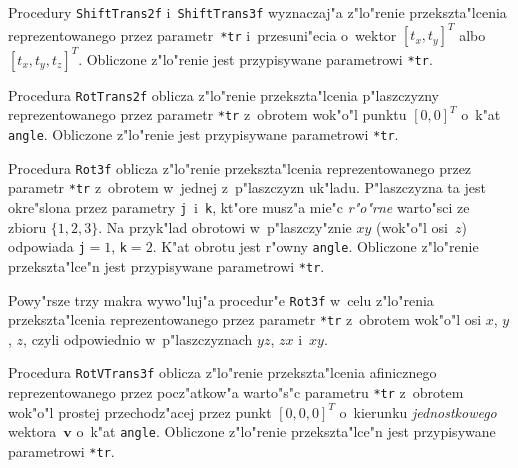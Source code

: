 \vspace{\bigskipamount}
Procedury \texttt{ShiftTrans2f} i~\texttt{ShiftTrans3f} wyznaczaj"a
z"lo"renie przekszta"lcenia reprezentowanego przez parametr~\texttt{*tr}
i~przesuni"ecia o~wektor $[t_x,t_y]^T$ albo $[t_x,t_y,t_z]^T$.
Obliczone z"lo"renie jest przypisywane parametrowi \texttt{*tr}.
 
\vspace{\bigskipamount}
Procedura \texttt{RotTrans2f} oblicza z"lo"renie przekszta"lcenia
p"laszczyzny reprezentowanego przez parametr \texttt{*tr} z~obrotem
wok"o"l punktu $[0,0]^T$ o~k"at \texttt{angle}. 
Obliczone z"lo"renie jest przypisywane parametrowi \texttt{*tr}.

\vspace{\bigskipamount}
Procedura \texttt{Rot3f} oblicza z"lo"renie przekszta"lcenia
reprezentowanego przez parametr \texttt{*tr} z~obrotem w~jednej
z~p"laszczyzn uk"ladu. P"laszczyzna ta jest okre"slona przez parametry
\texttt{j}~i~\texttt{k}, kt"ore musz"a mie"c \emph{r"o"rne} warto"sci ze
zbioru $\{1,2,3\}$. Na przyk"lad obrotowi w~p"laszczy"znie $xy$ (wok"o"l
osi~$z$) odpowiada \texttt{j}${}=1$, \texttt{k}${}=2$. K"at obrotu jest r"owny
\texttt{angle}.
Obliczone z"lo"renie przekszta"lce"n jest przypisywane parametrowi
\texttt{*tr}.

\newpage
Powy"rsze trzy makra wywo"luj"a procedur"e \texttt{Rot3f} w~celu z"lo"renia
przekszta"lcenia reprezentowanego przez parametr \texttt{*tr} z~obrotem
wok"o"l osi $x$, $y$, $z$, czyli odpowiednio w~p"laszczyznach $yz$, $zx$
i~$xy$.

\vspace{\bigskipamount}
\begin{sloppypar}
Procedura \texttt{RotVTrans3f} oblicza z"lo"renie przekszta"lcenia
afinicznego reprezentowanego przez pocz"atkow"a warto"s"c parametru
\texttt{*tr} z~obrotem wok"o"l prostej
przechodz"acej przez punkt $[0,0,0]^T$ o~kierunku \emph{jednostkowego}
wektora~$\bm{v}$ o~k"at \texttt{angle}.
Obliczone z"lo"renie przekszta"lce"n jest przypisywane parametrowi
\texttt{*tr}.
\end{sloppypar}

